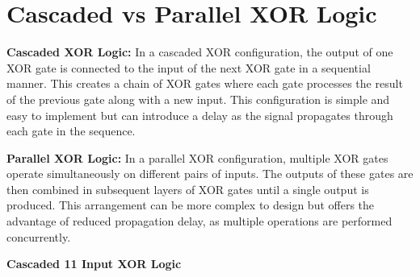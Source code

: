 \documentclass{article}
\begin{document}
  

\section*{Cascaded vs Parallel XOR Logic}

\textbf{Cascaded XOR Logic:} In a cascaded XOR configuration, the output of one XOR gate is connected to the input of the next XOR gate in a sequential manner. This creates a chain of XOR gates where each gate processes the result of the previous gate along with a new input. This configuration is simple and easy to implement but can introduce a delay as the signal propagates through each gate in the sequence.

\textbf{Parallel XOR Logic:} In a parallel XOR configuration, multiple XOR gates operate simultaneously on different pairs of inputs. The outputs of these gates are then combined in subsequent layers of XOR gates until a single output is produced. This arrangement can be more complex to design but offers the advantage of reduced propagation delay, as multiple operations are performed concurrently.

\begin{center}  
    \textbf{Cascaded 11 Input XOR Logic}  
\end{center}  
\end{document}
